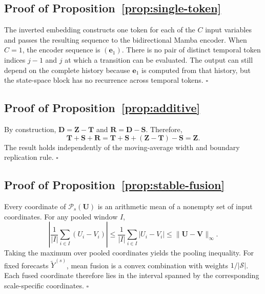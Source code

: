 \subsection{Proof of Proposition~\ref{prop:single-token}}

The inverted embedding constructs one token for each of the $C$ input variables and passes the resulting sequence to the bidirectional Mamba encoder.
When $C=1$, the encoder sequence is $(\mathbf{e}_1)$.
There is no pair of distinct temporal token indices $j-1$ and $j$ at which a transition can be evaluated.
The output can still depend on the complete history because $\mathbf{e}_1$ is computed from that history, but the state-space block has no recurrence across temporal tokens.
\hfill$\square$

\subsection{Proof of Proposition~\ref{prop:additive}}

By construction, $\mathbf{D}=\mathbf{Z}-\mathbf{T}$ and $\mathbf{R}=\mathbf{D}-\mathbf{S}$.
Therefore,
\begin{equation}
    \mathbf{T}+\mathbf{S}+\mathbf{R}
    =\mathbf{T}+\mathbf{S}+(\mathbf{Z}-\mathbf{T})-\mathbf{S}
    =\mathbf{Z}.
\end{equation}
The result holds independently of the moving-average width and boundary replication rule.
\hfill$\square$

\subsection{Proof of Proposition~\ref{prop:stable-fusion}}

Every coordinate of $\mathcal{P}_s(\mathbf{U})$ is an arithmetic mean of a nonempty set of input coordinates.
For any pooled window $I$,
\begin{equation}
    \left|\frac{1}{|I|}\sum_{i\in I}(U_i-V_i)\right|
    \leq \frac{1}{|I|}\sum_{i\in I}|U_i-V_i|
    \leq \|\mathbf{U}-\mathbf{V}\|_{\infty}.
\end{equation}
Taking the maximum over pooled coordinates yields the pooling inequality.
For fixed forecasts $\widetilde{Y}^{(s)}$, mean fusion is a convex combination with weights $1/|\mathcal{S}|$.
Each fused coordinate therefore lies in the interval spanned by the corresponding scale-specific coordinates.
\hfill$\square$
